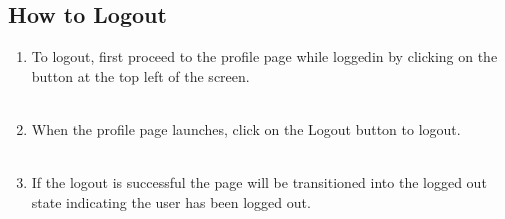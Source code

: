 \documentclass[12pt,a4paper]{article}
\begin{document}
			\newpage

			\subsection{How to Logout}
				\begin{enumerate}
					\item To logout, first proceed to the profile page while loggedin by clicking on the button at 
						the top left of the screen.\\\\
					\item When the profile page launches, click on the Logout button to logout.\\\\
						\newpage
					\item If the logout is successful the page will be transitioned into the logged out state 
						indicating the user has been logged out.\\\\
				\end{enumerate}
\end{document}
